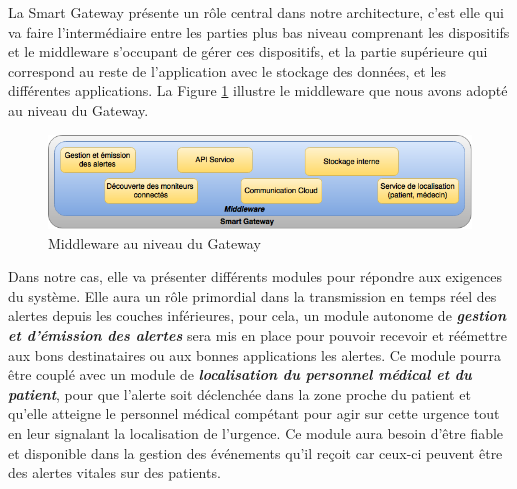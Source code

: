 La Smart Gateway présente un rôle central dans notre architecture, c’est elle qui va faire l’intermédiaire entre les parties plus bas niveau comprenant les dispositifs et le middleware s’occupant de gérer ces dispositifs, et la partie supérieure qui correspond au reste de l’application avec le stockage des données, et les différentes applications. La Figure \ref{gateway} illustre le middleware que nous avons adopté au niveau du Gateway.
\newline
\begin{figure}[h!]
	\hspace*{-3cm}
	\centering
	\includegraphics[width=1.5\textwidth]{Figure6.png}
	\caption{Middleware au niveau du Gateway}
	\label{gateway}
\end{figure}

Dans notre cas, elle va présenter différents modules pour répondre aux exigences du système. Elle aura un rôle primordial dans la transmission en temps réel des alertes depuis les couches inférieures, pour cela, un module autonome de \textbf{\textit{gestion et d’émission des alertes}} sera mis en place pour pouvoir recevoir et réémettre aux bons destinataires ou aux bonnes applications les alertes. Ce module pourra être couplé avec un module de \textbf{\textit{localisation du personnel médical et du patient}}, pour que l’alerte soit déclenchée dans la zone proche du patient et qu’elle atteigne le personnel médical compétant pour agir sur cette urgence tout en leur signalant la localisation de l’urgence. Ce module aura besoin d’être fiable et disponible dans la gestion des événements qu’il reçoit car ceux-ci peuvent être des alertes vitales sur des patients.

